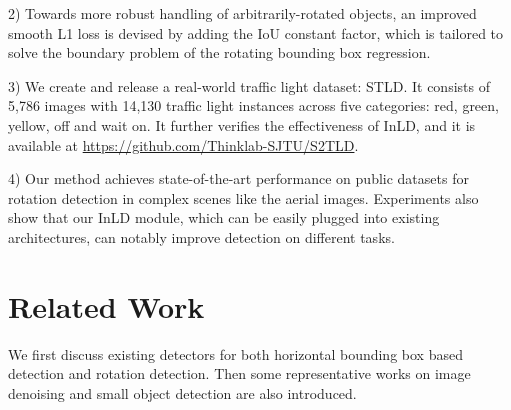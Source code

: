 \documentclass[10pt,journal,compsoc]{IEEEtran}
\begin{document}
2) Towards more robust handling of arbitrarily-rotated objects, an improved smooth L1 loss is devised by adding the IoU constant factor, which is tailored to solve the boundary problem of the rotating bounding box regression.

3) We create and release a real-world traffic light dataset: STLD. It consists of 5,786 images with 14,130 traffic light instances across five categories: red, green, yellow, off and wait on. It further verifies the effectiveness of InLD, and it is available at \url{https://github.com/Thinklab-SJTU/S2TLD}.

4) Our method achieves state-of-the-art performance on public datasets for rotation detection in complex scenes like the aerial images. Experiments also show that our InLD module, which can be easily plugged into existing architectures, can notably improve detection on different tasks.



\section{Related Work}\label{sec:related}
We first discuss existing detectors for both horizontal bounding box based detection and rotation detection. Then some representative works on image denoising and small object detection are also introduced. 
\end{document}
